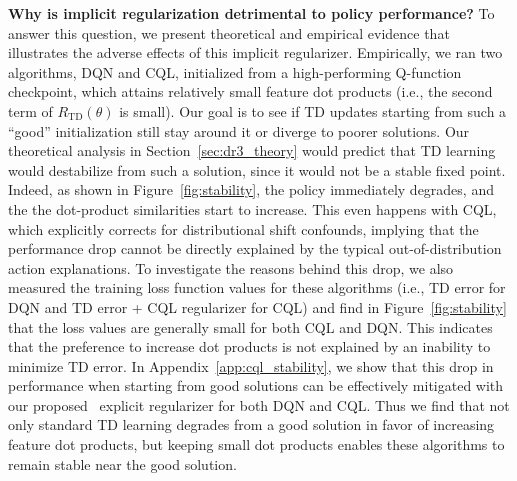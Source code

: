 \textbf{Why is implicit regularization detrimental to policy performance?}
To answer this question, we present theoretical and empirical evidence that illustrates the adverse effects of this implicit regularizer. Empirically, we ran two algorithms, DQN and CQL, initialized from a high-performing Q-function checkpoint,
which attains relatively small feature dot products (i.e., the second term of $R_\mathrm{TD}(\theta)$ is small). Our goal is to see if TD updates starting from such a ``good'' initialization still stay around it or diverge to poorer solutions. Our theoretical analysis in Section~\ref{sec:dr3_theory} would predict that TD learning would destabilize from such a solution, since it would not be a stable fixed point. Indeed, as shown in Figure~\ref{fig:stability}, the policy immediately degrades, and the the dot-product similarities start to increase. This even happens with CQL, which explicitly corrects for distributional shift confounds, implying that the performance drop cannot be directly explained by the typical out-of-distribution action explanations. To investigate the reasons behind this drop, we also measured the training loss function values for these algorithms (i.e., TD error for DQN and TD error + CQL regularizer for CQL) and find in Figure~\ref{fig:stability} that the loss values are generally small for both CQL and DQN. This indicates that the preference to increase dot products is not explained by an inability to minimize TD error. 
In Appendix~\ref{app:cql_stability}, we show that this drop in performance when starting from good solutions can be effectively mitigated with our proposed \methodname\ explicit regularizer for both DQN and CQL. Thus we find that not only standard TD learning degrades from a good solution in favor of increasing feature dot products, but keeping small dot products enables these algorithms to remain stable near the good solution.

